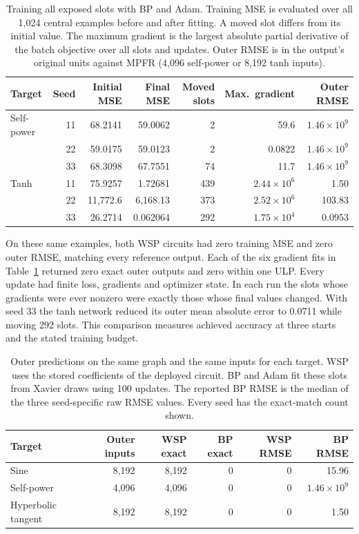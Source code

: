 \begin{table}[htbp]
\centering\small\setlength{\tabcolsep}{4pt}
\caption{Training all exposed slots with BP and Adam. Training MSE is evaluated over all 1,024 central examples before and after fitting. A moved slot differs from its initial value. The maximum gradient is the largest absolute partial derivative of the batch objective over all slots and updates. Outer RMSE is in the output's original units against MPFR (4,096 self-power or 8,192 tanh inputs).}
\label{tab:smooth-gradients}
\begin{tabular}{@{}lrrrrrr@{}}\toprule
Target & Seed & Initial MSE & Final MSE & Moved slots & Max.\ gradient & Outer RMSE\\\midrule
Self-power & 11 & 68.2141 & 59.0062 & 2 & 59.6 & $1.46\times10^9$\\
 & 22 & 59.0175 & 59.0123 & 2 & 0.0822 & $1.46\times10^9$\\
 & 33 & 68.3098 & 67.7551 & 74 & 11.7 & $1.46\times10^9$\\
Tanh & 11 & 75.9257 & 1.72681 & 439 & $2.44\times10^6$ & 1.50\\
 & 22 & 11,772.6 & 6,168.13 & 373 & $2.52\times10^6$ & 103.83\\
 & 33 & 26.2714 & 0.062064 & 292 & $1.75\times10^4$ & 0.0953\\\bottomrule
\end{tabular}
\end{table}
On these same examples, both WSP circuits had zero training MSE and zero outer RMSE, matching every reference output. Each of the six gradient fits in Table~\ref{tab:smooth-gradients} returned zero exact outer outputs and zero within one ULP. Every update had finite loss, gradients and optimizer state. In each run the slots whose gradients were ever nonzero were exactly those whose final values changed. With seed 33 the tanh network reduced its outer mean absolute error to 0.0711 while moving 292 slots. This comparison measures achieved accuracy at three starts and the stated training budget.

\begin{table}[htbp]
\centering\small\setlength{\tabcolsep}{5pt}
\caption{Outer predictions on the same graph and the same inputs for each target. WSP uses the stored coefficients of the deployed circuit. BP and Adam fit these slots from Xavier draws using 100 updates. The reported BP RMSE is the median of the three seed-specific raw RMSE values. Every seed has the exact-match count shown.}
\label{tab:matched-smooth-rmse}
\begin{tabular}{@{}lrrrrr@{}}\toprule
Target & Outer inputs & WSP exact & BP exact & WSP RMSE & BP RMSE\\\midrule
Sine & 8,192 & 8,192 & 0 & 0 & 15.96\\
Self-power & 4,096 & 4,096 & 0 & 0 & $1.46\times10^{9}$\\
Hyperbolic tangent & 8,192 & 8,192 & 0 & 0 & 1.50\\\bottomrule
\end{tabular}
\end{table}
